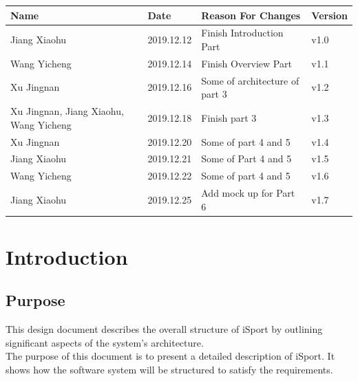 \documentclass[16pt]{scrreprt}
\begin{document}
\begin{center}
    \begin{tabular}{|p{5cm}|p{3cm}|p{7cm}|p{2cm}|}
        \hline
        Name & Date & Reason For Changes & Version\\
        \hline
        Jiang Xiaohu & 2019.12.12 & Finish Introduction Part  & v1.0\\
        \hline
        Wang Yicheng & 2019.12.14 & Finish Overview Part & v1.1\\
        \hline
        Xu Jingnan & 2019.12.16 & Some of architecture of part 3 & v1.2\\
        \hline
        Xu Jingnan, Jiang Xiaohu, Wang Yicheng & 2019.12.18 & Finish part 3 & v1.3\\
        \hline
        Xu Jingnan & 2019.12.20 & Some of part 4 and 5 & v1.4\\
        \hline
        Jiang Xiaohu & 2019.12.21 & Some of Part 4 and 5  & v1.5\\
        \hline
        Wang Yicheng & 2019.12.22 & Some of part 4 and 5 & v1.6\\
        \hline
        Jiang Xiaohu & 2019.12.25 & Add mock up for Part 6 & v1.7\\
        \hline
    \end{tabular}
\end{center}

\chapter{Introduction}

\section{Purpose}
This design document describes the overall structure of iSport by outlining significant aspects of the system’s architecture.\\

\noindent  The purpose of this document is to present a detailed description of iSport. It shows how the software system will be structured to satisfy the requirements.
\end{document}
